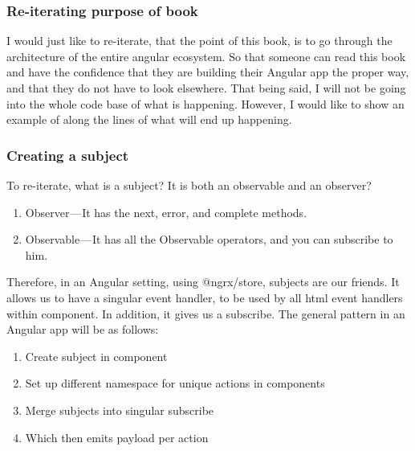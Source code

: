 \subsubsection{ Re-iterating purpose of book }

I would just like to re-iterate, that the point of this book, is to go through
the architecture of the entire angular ecosystem. So that someone can read this
book and have the confidence that they are building their Angular app the proper
way, and that they do not have to look elsewhere. That being said, I will not be
going into the whole code base of what is happening. However, I would like to show
an example of along the lines of what will end up happening.

\subsubsection{ Creating a subject }

To re-iterate, what is a subject? It is both an observable and an observer?
\begin{enumerate}
  \item Observer — It has the next, error, and complete methods.
  \item Observable — It has all the Observable operators, and you can subscribe
  to him.
\end{enumerate}

Therefore, in an Angular setting, using @ngrx/store, subjects are our friends. It
allows us to have a singular event handler, to be used by all html event handlers
within component. In addition, it gives us a subscribe. The general pattern in
an Angular app will be as follows:
\begin{enumerate}
  \item Create subject in component
  \item Set up different namespace for unique actions in components
  \item Merge subjects into singular subscribe
  \item Which then emits payload per action
\end{enumerate}
